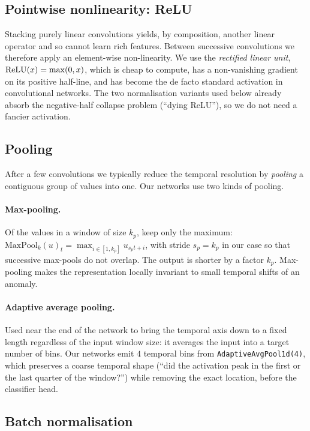 \subsection{Pointwise nonlinearity: ReLU}
\label{sec:relu-theory}

Stacking purely linear convolutions yields, by composition, another
linear operator and so cannot learn rich features. Between successive
convolutions we therefore apply an element-wise non-linearity. We use
the \emph{rectified linear unit}, $\operatorname{ReLU}(x) = \max(0, x)$, which is
cheap to compute, has a non-vanishing gradient on its positive half-line,
and has become the de facto standard activation in convolutional
networks. The two normalisation variants used below already absorb
the negative-half collapse problem (``dying ReLU''), so we do not need a
fancier activation.

\subsection{Pooling}
\label{sec:pool-theory}

After a few convolutions we typically reduce the temporal resolution by
\emph{pooling} a contiguous group of values into one. Our networks use
two kinds of pooling.

\paragraph{Max-pooling.} Of the values in a window of size $k_p$,
keep only the maximum:
$\mathrm{MaxPool}_k(u)_t = \max_{i \in [1, k_p]} u_{s_p t + i}$,
with stride $s_p = k_p$ in our case so that successive max-pools do not
overlap. The output is shorter by a factor $k_p$. Max-pooling makes
the representation locally invariant to small temporal shifts
of an anomaly.

\paragraph{Adaptive average pooling.} Used near the end of the network
to bring the temporal axis down to a fixed length regardless of the
input window size: it averages the input into a target number of bins.
Our networks emit $4$ temporal bins from \texttt{AdaptiveAvgPool1d(4)},
which preserves a coarse temporal shape (``did the activation peak in
the first or the last quarter of the window?'') while removing the
exact location, before the classifier head.

\subsection{Batch normalisation}
\label{sec:bn-theory}

